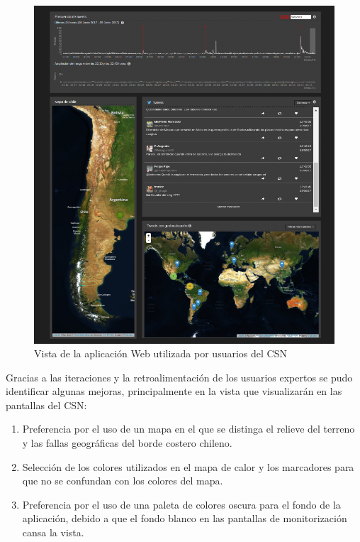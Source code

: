 	\begin{figure}[ht]
	  \centering
	  \includegraphics[trim={0 0 0 0}, clip, width=\textwidth]{imagenes/aplicacionexplorar_csn.png}
	  \caption{Vista de la aplicación Web utilizada por usuarios del CSN}
	\label{fig:webapp_csn}
	\end{figure}


Gracias a las iteraciones y la retroalimentación de los usuarios expertos se pudo identificar algunas mejoras, principalmente en la vista que visualizarán en las pantallas del CSN:

\begin{enumerate}
\item Preferencia por el uso de un mapa en el que se distinga el relieve del terreno y las fallas geográficas del borde costero chileno.
\item Selección de los colores utilizados en el mapa de calor y los marcadores para que no se confundan con los colores del mapa. 
\item Preferencia por el uso de una paleta de colores oscura para el fondo de la aplicación, debido a que el fondo blanco en las pantallas de monitorización cansa la vista.
\end{enumerate}


